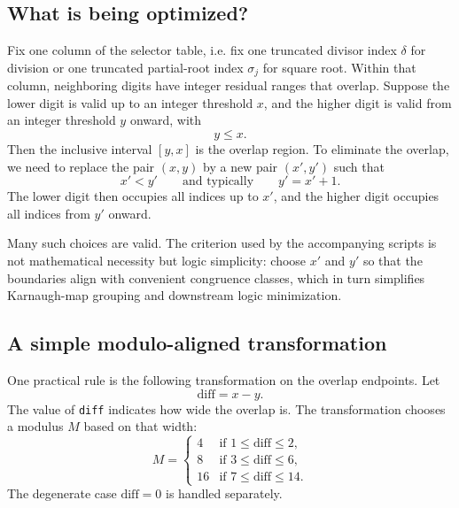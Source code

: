 \documentclass[11pt]{article}
\numberwithin{equation}{section}
\begin{document}
\subsection{What is being optimized?}
\label{ssec:optimized_overlap:goal}

Fix one column of the selector table, i.e. fix one truncated divisor index $\delta$ for division or
one truncated partial-root index $\sigma_j$ for square root.
Within that column, neighboring digits have integer residual ranges that overlap.
Suppose the lower digit is valid up to an integer threshold $x$, and the higher digit is valid from
an integer threshold $y$ onward, with
\[
  y \le x.
\]
Then the inclusive interval $[y,x]$ is the overlap region.
To eliminate the overlap, we need to replace the pair $(x,y)$ by a new pair $(x',y')$ such that
\begin{equation}
  \label{eq:optimized_overlap:no_overlap_pair}
  x' < y'
  \qquad \text{and typically} \qquad
  y' = x' + 1.
\end{equation}
The lower digit then occupies all indices up to $x'$, and the higher digit occupies all indices from
$y'$ onward.

Many such choices are valid.
The criterion used by the accompanying scripts is not mathematical necessity but logic simplicity:
choose $x'$ and $y'$ so that the boundaries align with convenient congruence classes, which in turn
simplifies Karnaugh-map grouping and downstream logic minimization.

\subsection{A simple modulo-aligned transformation}
\label{ssec:optimized_overlap:transform}

One practical rule is the following transformation on the overlap endpoints.
Let
\begin{equation}
  \label{eq:optimized_overlap:diff}
  \text{diff} = x-y.
\end{equation}
The value of \texttt{diff} indicates how wide the overlap is.
The transformation chooses a modulus $M$ based on that width:
\begin{equation}
  \label{eq:optimized_overlap:modulus_choice}
  M =
  \begin{cases}
    4  & \text{if } 1 \le \text{diff} \le 2, \\
    8  & \text{if } 3 \le \text{diff} \le 6, \\
    16 & \text{if } 7 \le \text{diff} \le 14.
  \end{cases}
\end{equation}
The degenerate case $\text{diff}=0$ is handled separately.
\end{document}
